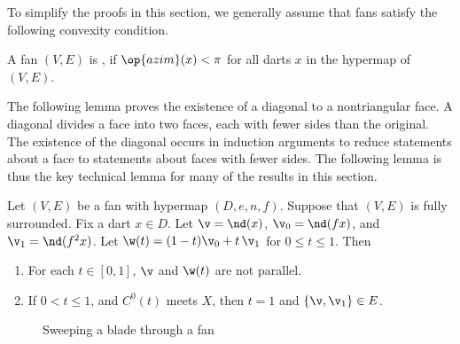 To simplify the proofs in this section,  we generally assume that fans 
satisfy the following  convexity condition.

\begin{definition}
A fan $(V,E)$ is , if $\op{azim}(x)<\pi$
for all darts $x$ in the hypermap of $(V,E)$.
\end{definition}
%

The following lemma proves the existence of a diagonal to a nontriangular
face.  A diagonal  divides a face into two faces, each with fewer sides
than the original.  The existence of the diagonal occurs in induction arguments
to reduce statements about a face to statements about faces with fewer sides.
The following lemma is thus the key technical lemma for many of the results
in this section.

\begin{lemma}[sweep]\label{lemma:sweep}  
Let $(V,E)$ be a fan with hypermap $(D,e,n,f)$.  
Suppose that $(V,E)$ is fully surrounded. Fix a dart $x\in D$.
Let $\v = \nd(x)$, $\v_0 = \nd(f x)$,
and $\v_1 = \nd(f^2 x)$.  Let $\w(t) = (1-t) \v_0 + t\, \v_1$ for
$0\le t\le 1$.  Then
\begin{enumerate}\wasitemize 
\item  For each $t\in[0,1]$, $\v$ and $\w(t)$ are not parallel.
\item If $0 < t \le 1$, and $C^0(t)$ meets $X$, then $t=1$ and
$\{\v,\v_1\}\in E$.
\end{enumerate}\wasitemize 
\end{lemma}


\begin{figure}[htb]
\centering
{}
\caption{Sweeping a blade through a fan}
\label{fig:vt}
\end{figure}



